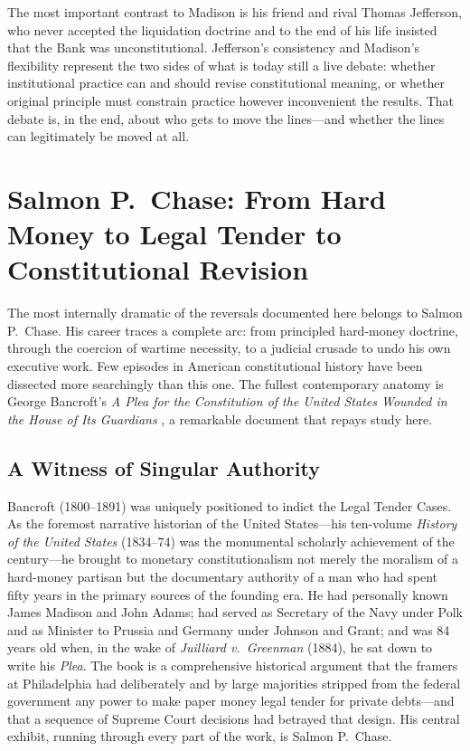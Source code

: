 \documentclass[12pt]{article}
\begin{document}
The most important contrast to Madison is his friend and rival Thomas
Jefferson, who never accepted the liquidation doctrine and to the end of
his life insisted that the Bank was unconstitutional.  Jefferson's
consistency and Madison's flexibility represent the two sides of what is
today still a live debate: whether institutional practice can and should
revise constitutional meaning, or whether original principle must
constrain practice however inconvenient the results.  That debate is,
in the end, about who gets to move the lines---and whether the lines
can legitimately be moved at all.


\section{Salmon P.~Chase: From Hard Money to Legal Tender to
         Constitutional Revision}

The most internally dramatic of the reversals documented here belongs
to Salmon P.\ Chase.  His career traces a complete arc: from principled
hard-money doctrine, through the coercion of wartime necessity, to a
judicial crusade to undo his own executive work.  Few episodes in
American constitutional history have been dissected more searchingly
than this one.  The fullest contemporary anatomy is George Bancroft's
\textit{A Plea for the Constitution of the United States Wounded in the
House of Its Guardians} \citep{Bancroft1886}, a remarkable document
that repays study here.

\subsection{A Witness of Singular Authority}

Bancroft (1800--1891) was uniquely positioned to indict the Legal Tender
Cases.  As the foremost narrative historian of the United States---his
ten-volume \textit{History of the United States} (1834--74) was the
monumental scholarly achievement of the century---he brought to monetary
constitutionalism not merely the moralism of a hard-money partisan but
the documentary authority of a man who had spent fifty years in the
primary sources of the founding era.  He had personally known James
Madison and John Adams; had served as Secretary of the Navy under Polk
and as Minister to Prussia and Germany under Johnson and Grant; and was
84 years old when, in the wake of \textit{Juilliard v.\ Greenman}
(1884), he sat down to write his \textit{Plea}.  The book is a
comprehensive historical argument that the framers at Philadelphia had
deliberately and by large majorities stripped from the federal
government any power to make paper money legal tender for private
debts---and that a sequence of Supreme Court decisions had betrayed that
design.  His central exhibit, running through every part of the work,
is Salmon P.\ Chase.
\end{document}
